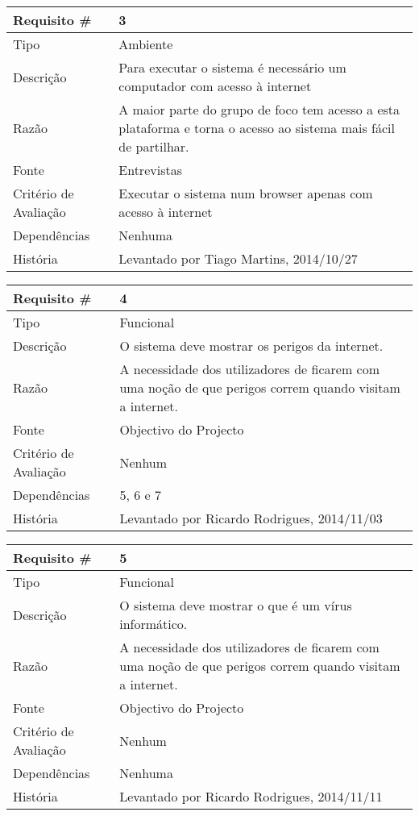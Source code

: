 \begin{tabular} {|l|p{8cm}|} 
\hline
Requisito \# & 3 \\
\hline
Tipo & Ambiente \\
\hline
Descrição & Para executar o sistema é necessário um computador com acesso à internet \\
\hline
Razão & A maior parte do grupo de foco tem acesso a esta plataforma e torna o acesso ao sistema mais fácil de partilhar. \\
\hline
Fonte & Entrevistas \\
\hline
Critério de Avaliação & Executar o sistema num browser apenas com acesso à internet\\
\hline
Dependências & Nenhuma \\
\hline
História & Levantado por Tiago Martins, 2014/10/27 \\
\hline
\end{tabular}

\begin{tabular} {|l|p{8cm}|} 
\hline
Requisito \# & 4 \\
\hline
Tipo & Funcional \\
\hline
Descrição & O sistema deve mostrar os perigos da internet. \\
\hline
Razão & A necessidade dos utilizadores de ficarem com uma noção de que perigos correm quando visitam a internet. \\
\hline
Fonte & Objectivo do Projecto \\
\hline
Critério de Avaliação & Nenhum\\
\hline
Dependências & 5, 6 e 7 \\
\hline
História & Levantado por Ricardo Rodrigues, 2014/11/03 \\
\hline
\end{tabular}

\begin{tabular} {|l|p{8cm}|} 
\hline
Requisito \# & 5 \\
\hline
Tipo & Funcional \\
\hline
Descrição & O sistema deve mostrar o que é um vírus informático. \\
\hline
Razão & A necessidade dos utilizadores de ficarem com uma noção de que perigos correm quando visitam a internet. \\
\hline
Fonte & Objectivo do Projecto \\
\hline
Critério de Avaliação & Nenhum\\
\hline
Dependências & Nenhuma \\
\hline
História & Levantado por Ricardo Rodrigues, 2014/11/11 \\
\hline
\end{tabular}

